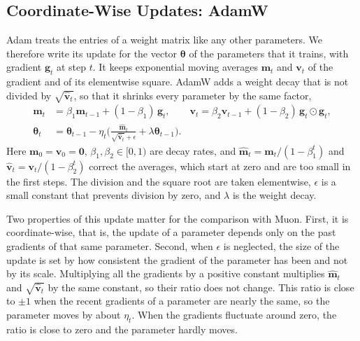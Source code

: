 \subsection{Coordinate-Wise Updates: AdamW}
\label{sec:background-adamw}
Adam \cite{kingma2015adam} treats the entries of a weight matrix like any other parameters. We therefore write its update for the vector $\boldsymbol{\theta}$ of the parameters that it trains, with gradient $\mathbf{g}_t$ at step $t$. It keeps exponential moving averages $\mathbf{m}_t$ and $\mathbf{v}_t$ of the gradient and of its elementwise square. AdamW \cite{loshchilov2019decoupled} adds a weight decay that is not divided by $\sqrt{\hat{\mathbf{v}}_t}$, so that it shrinks every parameter by the same factor,
\begin{equation}[eq:adamw-update]{}
  \begin{aligned}
    \mathbf{m}_t          & = \beta_1 \mathbf{m}_{t-1} + (1 - \beta_1) \, \mathbf{g}_t, \qquad \mathbf{v}_t = \beta_2 \mathbf{v}_{t-1} + (1 - \beta_2) \, \mathbf{g}_t \odot \mathbf{g}_t, \\
    \boldsymbol{\theta}_t & = \boldsymbol{\theta}_{t-1} - \eta_t \biggl( \frac{\hat{\mathbf{m}}_t}{\sqrt{\hat{\mathbf{v}}_t} + \epsilon} + \lambda \boldsymbol{\theta}_{t-1} \biggr).
  \end{aligned}
\end{equation}
Here $\mathbf{m}_0 = \mathbf{v}_0 = \mathbf{0}$, $\beta_1, \beta_2 \in [0, 1)$ are decay rates, and $\hat{\mathbf{m}}_t = \mathbf{m}_t / (1 - \beta_1^t)$ and $\hat{\mathbf{v}}_t = \mathbf{v}_t / (1 - \beta_2^t)$ correct the averages, which start at zero and are too small in the first steps. The division and the square root are taken elementwise, $\epsilon$ is a small constant that prevents division by zero, and $\lambda$ is the weight decay.

Two properties of this update matter for the comparison with Muon. First, it is coordinate-wise, that is, the update of a parameter depends only on the past gradients of that same parameter. Second, when $\epsilon$ is neglected, the size of the update is set by how consistent the gradient of the parameter has been and not by its scale. Multiplying all the gradients by a positive constant multiplies $\hat{\mathbf{m}}_t$ and $\sqrt{\hat{\mathbf{v}}_t}$ by the same constant, so their ratio does not change. This ratio is close to $\pm 1$ when the recent gradients of a parameter are nearly the same, so the parameter moves by about $\eta_t$. When the gradients fluctuate around zero, the ratio is close to zero and the parameter hardly moves.

